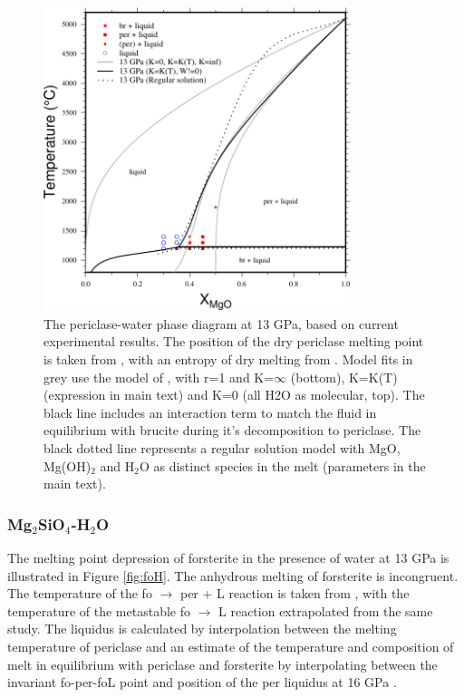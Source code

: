 \documentclass[review]{elsarticle}
\begin{document}
\begin{figure}[ht!]
  \centering
      \includegraphics[width=0.8\textwidth]{figures/per-H2O}
  \caption{The periclase-water phase diagram at 13 GPa, based on current experimental results. The position of the dry periclase melting point is taken from \cite{ZF2008}, with an entropy of dry melting from \cite{CG1994}. Model fits in grey use the model of \cite{SS1985}, with r=1 and K=$\infty$ (bottom), K=K(T) (expression in main text) and K=0 (all H2O as molecular, top). The black line includes an interaction term to match the fluid in equilibrium with brucite during it's decomposition to periclase. The black dotted line represents a regular solution model with MgO, Mg(OH)$_2$ and H$_2$O as distinct species in the melt (parameters in the main text).}
  \label{fig:MH}
\end{figure}

\clearpage
\subsubsection{Mg$_2$SiO$_4$-H$_2$O}
The melting point depression of forsterite in the presence of water at 13 GPa is illustrated in Figure \ref{fig:foH}. The anhydrous melting of forsterite is incongruent. The temperature of the fo $\rightarrow$ per + L reaction is taken from \citep{PW1993}, with the temperature of the metastable fo $\rightarrow$ L reaction extrapolated from the same study. The liquidus is calculated by interpolation between the melting temperature of periclase \citep{ZF2008} and an estimate of the temperature and composition of melt in equilibrium with periclase and forsterite by interpolating between the invariant fo-per-foL point \citep{PW1993} and position of the per liquidus at 16 GPa \citep{LF2012}.
\end{document}
